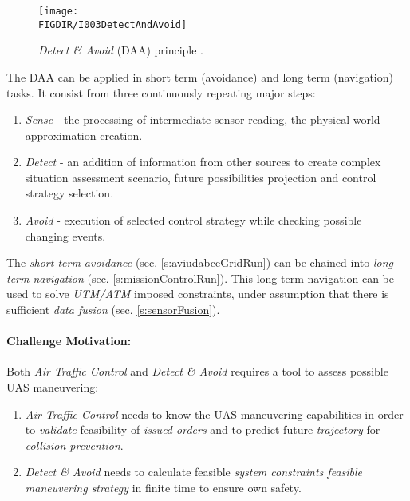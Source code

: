 \begin{figure}[H]
    \centering
    \texttt{[image: \\FIGDIR/I003DetectAndAvoid]}
    \caption{\emph{Detect \& Avoid} (DAA) principle \cite{jenie2014velocity}.}
    \label{fig:detectAdnAvoidIntroduction}
\end{figure}

\noindent The DAA can be applied in short term (avoidance) and long term (navigation) tasks. It consist from three continuously repeating major steps:
\begin{enumerate}
    \item \emph{Sense} - the processing of intermediate sensor reading, the physical world approximation creation.
    
    \item \emph{Detect} - an addition of information from other sources to create complex situation assessment scenario, future possibilities projection and control strategy selection.
    
    \item \emph{Avoid} - execution of selected control strategy while checking possible changing events.
\end{enumerate}

The \emph{short term avoidance} (sec. \ref{s:aviudabceGridRun}) can be chained into \emph{long term navigation} (sec. \ref{s:missionControlRun}). This long term navigation can be used to solve \emph{UTM/ATM} imposed constraints, under assumption that there is sufficient \emph{data fusion} (sec. \ref{s:sensorFusion}).

\paragraph{Challenge Motivation:} Both \emph{Air Traffic Control} and \emph{Detect \& Avoid} requires a tool to assess possible UAS maneuvering:

\begin{enumerate}
    \item \emph{Air Traffic Control} needs to know the UAS maneuvering capabilities in order to \emph{validate} feasibility of \emph{issued orders} and to predict future \emph{trajectory} for \emph{collision prevention}.
    
    \item \emph{Detect \& Avoid} needs to calculate feasible \emph{system constraints feasible maneuvering strategy} in finite time to ensure own safety. 
\end{enumerate}

